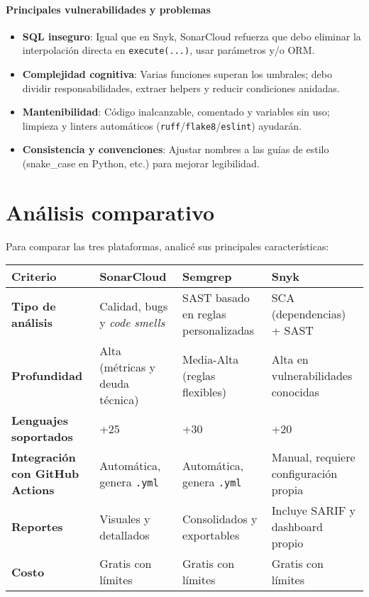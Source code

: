 \documentclass[12pt, a4paper]{article}
\begin{document}
\paragraph{Principales vulnerabilidades y problemas}
\begin{itemize}
  \item \textbf{SQL inseguro}: Igual que en Snyk, SonarCloud refuerza que debo eliminar la interpolación directa 
  en \texttt{execute(...)}, usar parámetros y/o ORM.
  \item \textbf{Complejidad cognitiva}: Varias funciones superan los umbrales; debo dividir responsabilidades, 
  extraer helpers y reducir condiciones anidadas.
  \item \textbf{Mantenibilidad}: Código inalcanzable, comentado y variables sin uso; limpieza y linters automáticos 
  (\texttt{ruff}/\texttt{flake8}/\texttt{eslint}) ayudarán.
  \item \textbf{Consistencia y convenciones}: Ajustar nombres a las guías de estilo (snake\_case en Python, etc.) 
  para mejorar legibilidad.
\end{itemize}

\section{Análisis comparativo}
Para comparar las tres plataformas, analicé sus principales características:

\begin{table}[h!]
\footnotesize
\centering
\begin{tabularx}{\textwidth}{@{} L{3.6cm} L{2.7cm} L{2.3cm} Y @{}}
\toprule
\textbf{Criterio} & \textbf{SonarCloud} & \textbf{Semgrep} & \textbf{Snyk} \\
\midrule
\textbf{Tipo de análisis} & Calidad, bugs y \textit{code smells} & SAST basado en reglas personalizadas & SCA (dependencias) + SAST \\
\textbf{Profundidad} & Alta (métricas y deuda técnica) & Media-Alta (reglas flexibles) & Alta en vulnerabilidades conocidas \\
\textbf{Lenguajes soportados} & +25 & +30 & +20 \\
\textbf{Integración con GitHub Actions} & Automática, genera \texttt{.yml} & Automática, genera \texttt{.yml} & Manual, requiere configuración propia \\
\textbf{Reportes} & Visuales y detallados & Consolidados y exportables & Incluye SARIF y dashboard propio \\
\textbf{Costo} & Gratis con límites & Gratis con límites & Gratis con límites\\
\bottomrule
\end{tabularx}
\end{table}
\end{document}
